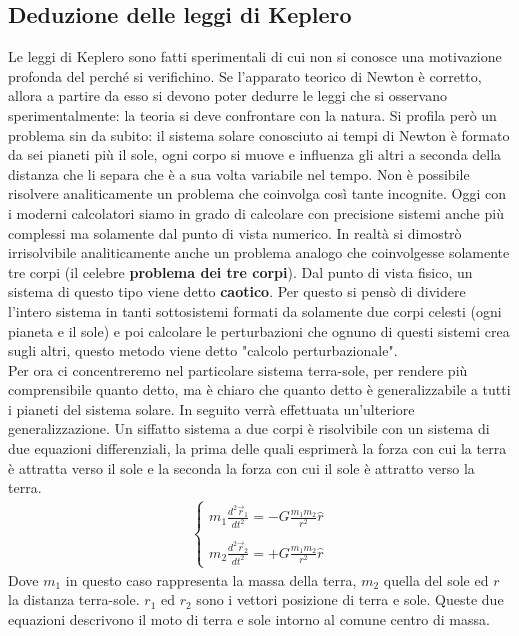 \subsection{Deduzione delle leggi di Keplero}
Le leggi di Keplero sono fatti sperimentali di cui non si conosce una motivazione profonda del perché si verifichino. Se l'apparato teorico di Newton è corretto, allora a partire da esso si devono poter dedurre le leggi che si osservano sperimentalmente: la teoria si deve confrontare con la natura.  Si profila però un problema sin da subito: il sistema solare conosciuto ai tempi di Newton è formato da sei pianeti più il sole, ogni corpo si muove e influenza gli altri a seconda della distanza che li separa che è a sua volta variabile nel tempo. Non è possibile risolvere analiticamente un problema che coinvolga così tante incognite. Oggi con i moderni calcolatori siamo in grado di calcolare con precisione sistemi anche più complessi ma solamente dal punto di vista numerico. In realtà si dimostrò irrisolvibile analiticamente anche un problema analogo che coinvolgesse solamente tre corpi (il celebre \textbf{problema dei tre corpi}). Dal punto di vista fisico, un sistema di questo tipo viene detto \textbf{caotico}. Per questo si pensò di dividere l'intero sistema in tanti sottosistemi formati da solamente due corpi celesti (ogni pianeta e il sole) e poi calcolare le perturbazioni che ognuno di questi sistemi crea sugli altri, questo metodo viene detto "calcolo perturbazionale".\\
Per ora ci concentreremo nel particolare sistema terra-sole, per rendere più comprensibile quanto detto, ma è chiaro che quanto detto è generalizzabile a tutti i pianeti del sistema solare. In seguito verrà effettuata un'ulteriore generalizzazione. Un siffatto sistema a due corpi è risolvibile con un sistema di due equazioni differenziali, la prima delle quali esprimerà la forza con cui la terra è attratta verso il sole e la seconda la forza con cui il sole è attratto verso la terra.
\begin{align*}
\begin{cases}
	m_1\frac{d^2\vec{r}_1}{dt^2} = -G\frac{m_1m_2}{r^2}\hat{r}\\\\
	m_2\frac{d^2\vec{r}_2}{dt^2} = +G\frac{m_1m_2}{r^2}\hat{r}
\end{cases}
\end{align*}
Dove $m_1$ in questo caso rappresenta la massa della terra, $m_2$ quella del sole ed $r$ la distanza terra-sole. $r_1$ ed $r_2$ sono i vettori posizione di terra e sole. Queste due equazioni descrivono il moto di terra e sole intorno al comune centro di massa. \\
